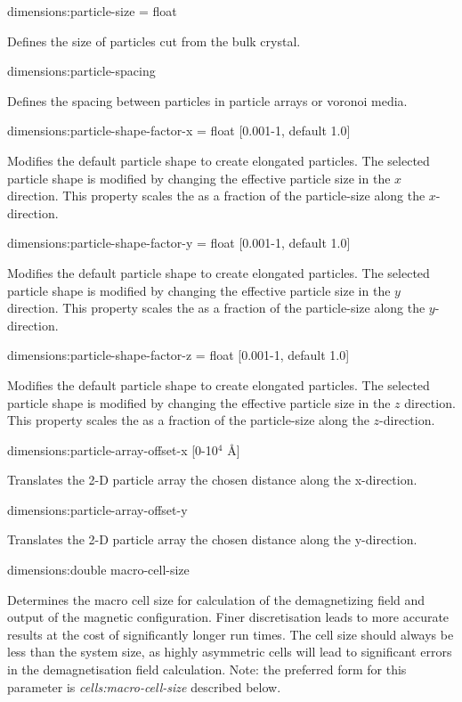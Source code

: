 {\zicf dimensions:particle-size = float} Defines the size of particles cut from the bulk crystal.

{\zicf dimensions:particle-spacing} Defines the spacing between particles in particle arrays or voronoi media.


{\zicf dimensions:particle-shape-factor-x = float [0.001-1, default 1.0]} 
Modifies the default particle shape to create elongated particles. The selected
particle shape is modified by changing the effective particle size in the $x$
direction. This property scales the as a fraction of the particle-size along the
$x$-direction.

{\zicf dimensions:particle-shape-factor-y = float [0.001-1, default 1.0]} 
Modifies the default particle shape to create elongated particles. The selected
particle shape is modified by changing the effective particle size in the $y$
direction. This property scales the as a fraction of the particle-size along the
$y$-direction.

{\zicf dimensions:particle-shape-factor-z = float [0.001-1, default 1.0]}
Modifies the default particle shape to create elongated particles. The selected
particle shape is modified by changing the effective particle size in the $z$
direction. This property scales the as a fraction of the particle-size along the
$z$-direction.

{\zicf dimensions:particle-array-offset-x [0-10$^4$ \AA]}
Translates the 2-D particle array the chosen distance along the x-direction.

{\zicf dimensions:particle-array-offset-y}
Translates the 2-D particle array the chosen distance along the y-direction.

{\zicf dimensions:double macro-cell-size}
Determines the macro cell size for calculation of the demagnetizing field and
output of the magnetic configuration. Finer discretisation leads to more
accurate results at the cost of significantly longer run times. The cell size
should always be less than the system size, as highly asymmetric cells will lead
to significant errors in the demagnetisation field calculation. Note: the preferred form for this parameter is \textit{cells:macro-cell-size} described below.

